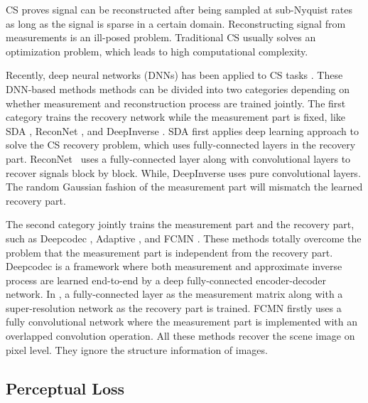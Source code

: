 \documentclass[runningheads]{llncs}
\begin{document}
CS \cite{donoho2006cs} \cite{Kunis2008Random} \cite{Tropp2007Signal} proves signal can be reconstructed after being sampled at sub-Nyquist rates as long as the signal is sparse in a certain domain. Reconstructing signal from measurements is an ill-posed problem. Traditional CS usually solves an optimization problem, which leads to high computational complexity.

Recently, deep neural networks (DNNs) has been applied to CS tasks \cite{Mousavi2016A} \cite{Kulkarni2016ReconNet} \cite{Mousavi2017Learning} \cite{Mousavi2017DeepCodec} \cite{Xie2017Adaptive} \cite{xie2017Fully}. These DNN-based methods methods can be divided into two categories depending on whether measurement and reconstruction process are trained jointly.
The first category trains the recovery network while the measurement part is fixed, like SDA \cite{Mousavi2016A}, ReconNet \cite{Kulkarni2016ReconNet}, and DeepInverse \cite{Mousavi2017Learning}.
SDA \cite{Mousavi2016A} first applies deep learning approach to solve the CS recovery problem, which uses fully-connected layers in the recovery part.
ReconNet~\cite{Kulkarni2016ReconNet} uses a fully-connected layer along with convolutional layers to recover signals block by block.
While, DeepInverse \cite{Mousavi2017Learning} uses pure convolutional layers.
The random Gaussian fashion of the measurement part will mismatch the learned recovery part.

The second category jointly trains the measurement part and the recovery part,
such as Deepcodec \cite{Mousavi2017DeepCodec}, Adaptive \cite{Xie2017Adaptive}, and FCMN \cite{xie2017Fully}.
These methods totally overcome the problem that the measurement part is independent from the recovery part.
Deepcodec \cite{Mousavi2017DeepCodec} is a framework where both measurement and approximate inverse process are learned end-to-end by a deep fully-connected encoder-decoder network. In \cite{Xie2017Adaptive}, a fully-connected layer as the measurement matrix along with a super-resolution network as the recovery part is trained. FCMN \cite{xie2017Fully} firstly uses a fully convolutional network where the measurement part is implemented with an overlapped convolution operation.
All these methods recover the scene image on pixel level. They ignore the structure information of images.

\subsection{Perceptual Loss}
\end{document}
